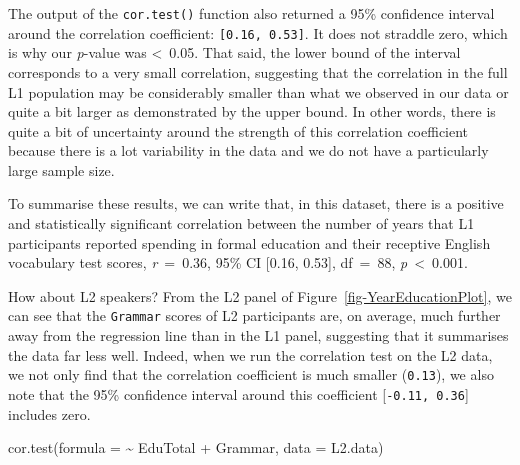 \documentclass[
  letterpaper,
  DIV=11,
  numbers=noendperiod]{scrreprt}
\newenvironment{Shaded}{\begin{snugshade}}{\end{snugshade}}
\newcommand{\AttributeTok}[1]{\textcolor[rgb]{0.40,0.45,0.13}{#1}}
\newcommand{\FunctionTok}[1]{\textcolor[rgb]{0.28,0.35,0.67}{#1}}
\newcommand{\NormalTok}[1]{\textcolor[rgb]{0.00,0.23,0.31}{#1}}
\newcommand{\SpecialCharTok}[1]{\textcolor[rgb]{0.37,0.37,0.37}{#1}}
\begin{document}
The output of the \texttt{cor.test()} function also returned a 95\%
confidence interval around the correlation coefficient:
\texttt{{[}0.16,\ 0.53{]}}. It does not straddle zero, which is why our
\emph{p}-value was \textless~0.05. That said, the lower bound of the
interval corresponds to a very small correlation, suggesting that the
correlation in the full L1 population may be considerably smaller than
what we observed in our data or quite a bit larger as demonstrated by
the upper bound. In other words, there is quite a bit of uncertainty
around the strength of this correlation coefficient because there is a
lot variability in the data and we do not have a particularly large
sample size.

\begin{tcolorbox}[enhanced jigsaw, arc=.35mm, bottomrule=.15mm, bottomtitle=1mm, breakable, colback=white, colbacktitle=quarto-callout-note-color!10!white, colframe=quarto-callout-note-color-frame, coltitle=black, left=2mm, leftrule=.75mm, opacityback=0, opacitybacktitle=0.6, rightrule=.15mm, title=\textcolor{quarto-callout-note-color}{\faInfo}\hspace{0.5em}{How to report correlation tests}, titlerule=0mm, toprule=.15mm, toptitle=1mm]

To summarise these results, we can write that, in this dataset, there is
a positive and statistically significant correlation between the number
of years that L1 participants reported spending in formal education and
their receptive English vocabulary test scores, \emph{r}~=~0.36, 95\% CI
{[}0.16, 0.53{]}, df~=~88, \emph{p}~\textless~0.001.

\end{tcolorbox}

How about L2 speakers? From the L2 panel of
Figure~\ref{fig-YearEducationPlot}, we can see that the \texttt{Grammar}
scores of L2 participants are, on average, much further away from the
regression line than in the L1 panel, suggesting that it summarises the
data far less well. Indeed, when we run the correlation test on the L2
data, we not only find that the correlation coefficient is much smaller
(\texttt{0.13}), we also note that the 95\% confidence interval around
this coefficient {[}\texttt{-0.11,\ 0.36}{]} includes zero.

\begin{Shaded}
\begin{Highlighting}[]
\FunctionTok{cor.test}\NormalTok{(}\AttributeTok{formula =} \SpecialCharTok{\textasciitilde{}}\NormalTok{ EduTotal }\SpecialCharTok{+}\NormalTok{ Grammar,}
         \AttributeTok{data =}\NormalTok{ L2.data)}
\end{Highlighting}
\end{Shaded}
\end{document}
